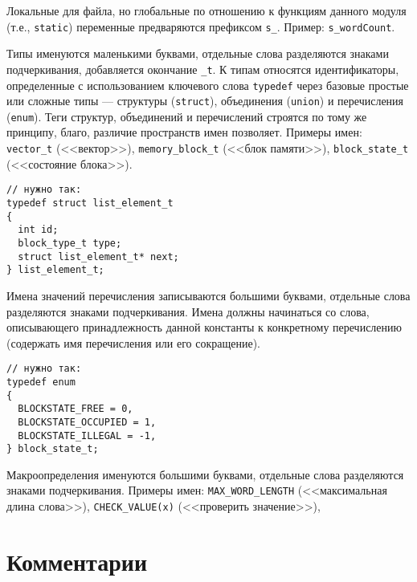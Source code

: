 \zzstyleitem

Локальные для файла, но глобальные по отношению к функциям данного
модуля (т.е., \texttt{static}) переменные предваряются префиксом
\texttt{s\_}. Пример: \linebreak \texttt{s\_wordCount}.

\zzstyleitem

Типы именуются маленькими буквами, отдельные слова разделяются знаками
подчеркивания, добавляется окончание \texttt{\_t}. К типам относятся
идентификаторы, определенные с использованием ключевого слова
\texttt{typedef} через базовые простые или сложные типы --- структуры
(\texttt{struct}), объединения (\texttt{union}) и перечисления
(\texttt{enum}). Теги структур, объединений и перечислений строятся по
тому же принципу, благо, различие пространств имен позволяет. Примеры
имен: \texttt{vector\_t} (<<вектор>>), \texttt{memory\_block\_t} (<<блок
памяти>>), \texttt{block\_state\_t} (<<состояние блока>>).

\begin{verbatim}
// нужно так:
typedef struct list_element_t
{
  int id;
  block_type_t type;
  struct list_element_t* next;
} list_element_t;
\end{verbatim}

\zzstyleitem

Имена значений перечисления записываются большими буквами, отдельные
слова разделяются знаками подчеркивания. Имена должны начинаться со
слова, описывающего принадлежность данной константы к конкретному
перечислению (содержать имя перечисления или его сокращение).

\begin{verbatim}
// нужно так:
typedef enum
{
  BLOCKSTATE_FREE = 0,
  BLOCKSTATE_OCCUPIED = 1,
  BLOCKSTATE_ILLEGAL = -1,
} block_state_t;
\end{verbatim}

\zzstyleitem

Макроопределения именуются большими буквами, отдельные слова разделяются
знаками подчеркивания. Примеры имен: \texttt{MAX\_WORD\_LENGTH}
(<<максимальная длина слова>>), \texttt{CHECK\_VALUE(x)} (<<проверить
значение>>),


\section{Комментарии}


